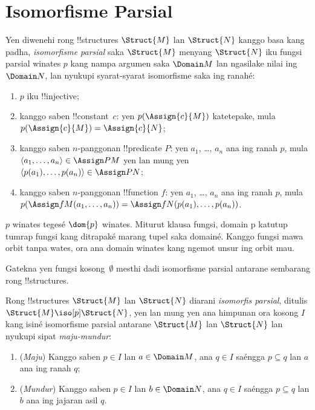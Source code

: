 \documentclass[../../../include/open-logic-section]{subfiles}
\begin{document}
\section{Isomorfisme Parsial}

\begin{defn}
  Yen diwenehi rong !!{structure}s $\Struct{M}$
  lan $\Struct{N}$ kanggo basa kang padha, \emph{isomorfisme parsial}
  saka $\Struct{M}$ menyang $\Struct{N}$
  iku fungsi parsial winates $p$
  kang nampa argumen saka $\Domain M$
  lan ngasilake nilai ing $\Domain N$,
  lan nyukupi syarat-syarat isomorfisme
  saka 
  ing ranahé:
  \begin{enumerate}
  \item $p$ iku !!{injective};
  \item kanggo saben !!{constant}~$c$:
    yen $p(\Assign{c}{M})$ katetepake,
    mula $p(\Assign{c}{M}) = \Assign{c}{N}$;
  \item kanggo saben $n$-panggonan
    !!{predicate} $P$: yen $a_1$, \dots, $a_n$
    ana ing ranah $p$, mula
    $\langle a_1, \dots, a_n\rangle \in
    \Assign P M$ yen lan mung yen
    $\langle p(a_1), \dots, p(a_n) \rangle
    \in \Assign P N$;
  \item kanggo saben $n$-panggonan
    !!{function} $f$: yen $a_1$, \dots, $a_n$
    ana ing ranah $p$, mula
    $p(\Assign f M (a_1, \dots,a_n))
    = \Assign f N (p(a_1), \dots, p(a_n))$.
  \end{enumerate}
  $p$ winates tegesé $\dom{p}$ winates. Miturut klausa fungsi, domain p katutup tumrap fungsi kang ditrapaké marang tupel saka domainé. Kanggo fungsi mawa orbit tanpa wates, ora ana domain winates kang ngemot unsur ing orbit mau.
\end{defn}

Gatekna yen fungsi kosong~$\emptyset$
mesthi dadi isomorfisme parsial
antarane sembarang rong !!{structure}s.

\begin{defn}
  Rong !!{structure}s $\Struct{M}$
  lan $\Struct{N}$ diarani
  \emph{isomorfis parsial}, ditulis
  $\Struct{M} \iso[p]
  \Struct{N}$, yen lan mung yen
  ana himpunan ora kosong $I$
  kang isiné isomorfisme parsial
  antarane $\Struct{M}$ lan $\Struct{N}$
  lan nyukupi sipat \emph{maju-mundur}:
  \begin{enumerate}
  \item (\emph{Maju}) Kanggo saben $p \in I$
    lan $a \in \Domain M$,
    ana $q \in I$ saéngga
    $p \subseteq q$ lan $a$
    ana ing ranah $q$;
  \item (\emph{Mundur}) Kanggo saben $p \in I$
    lan $b \in \Domain N$,
    ana $q \in I$ saéngga
    $p \subseteq q$ lan $b$
    ana ing jajaran asil $q$.
  \end{enumerate}
\end{defn}
\end{document}
